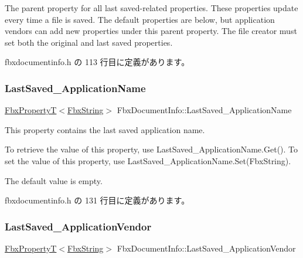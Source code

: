 The parent property for all last saved-\/related properties. These properties update every time a file is saved. The default properties are below, but application vendors can add new properties under this parent property. The file creator must set both the original and last saved properties. 

 fbxdocumentinfo.\+h の 113 行目に定義があります。

\mbox{\label{class_fbx_document_info_a336bfd3129c31d0739e87e19a344035b}} 
\subsubsection{\texorpdfstring{Last\+Saved\+\_\+\+Application\+Name}{LastSaved\_ApplicationName}}
{\footnotesize\ttfamily \hyperlink{class_fbx_property_t}{Fbx\+PropertyT}$<$\hyperlink{class_fbx_string}{Fbx\+String}$>$ Fbx\+Document\+Info\+::\+Last\+Saved\+\_\+\+Application\+Name}

This property contains the last saved application name.

To retrieve the value of this property, use Last\+Saved\+\_\+\+Application\+Name.\+Get(). To set the value of this property, use Last\+Saved\+\_\+\+Application\+Name.\+Set(\+Fbx\+String).

The default value is empty. 

 fbxdocumentinfo.\+h の 131 行目に定義があります。

\mbox{\label{class_fbx_document_info_a051cf70eb77b5b8278ebb9a88af20bef}} 
\subsubsection{\texorpdfstring{Last\+Saved\+\_\+\+Application\+Vendor}{LastSaved\_ApplicationVendor}}
{\footnotesize\ttfamily \hyperlink{class_fbx_property_t}{Fbx\+PropertyT}$<$\hyperlink{class_fbx_string}{Fbx\+String}$>$ Fbx\+Document\+Info\+::\+Last\+Saved\+\_\+\+Application\+Vendor}

